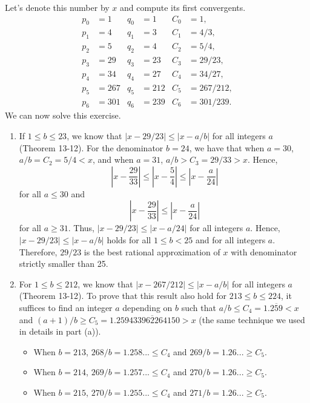 \begin{solution}
    Let's denote this number by $x$ and compute its first convergents.
    \begin{align*}
        p_0 &= 1 & q_0 &= 1 & C_0 &= 1, \\
        p_1 &= 4 & q_1 &= 3 & C_1 &= 4/3, \\
        p_2 &= 5 & q_2 &= 4 & C_2 &= 5/4, \\
        p_3 &= 29 & q_3 &= 23 & C_3 &= 29/23, \\
        p_4 &= 34 & q_4 &= 27 & C_4 &= 34/27, \\
        p_5 &= 267 & q_5 &= 212 & C_5 &= 267/212, \\
        p_6 &= 301 & q_6 &= 239 & C_6 &= 301/239.
    \end{align*} 
    We can now solve this exercise.
    \begin{enumerate}
        \item If $1 \leq b \leq 23$, we know that $|x - 29/23| \leq |x - a/b|$ for all integers $a$ (Theorem 13-12). For the denominator $b = 24$, we have that when $a = 30$, $a/b = C_2 = 5/4 < x$, and when $a = 31$, $a/b > C_3 = 29/33 > x$. Hence, 
        $$\left|x - \frac{29}{33}\right| \leq \left|x - \frac{5}{4}\right| \leq \left|x - \frac{a}{24}\right|$$
        for all $a \leq 30$ and 
        $$\left|x - \frac{29}{33}\right| \leq \left|x - \frac{a}{24}\right|$$
        for all $a \geq 31$. Thus, $|x - 29/23| \leq |x - a/24|$ for all integers $a$. Hence, $|x - 29/23| \leq |x - a/b|$ holds for all $1 \leq b < 25$ and for all integers $a$. Therefore, $29/23$ is the best rational approximation of $x$ with denominator strictly smaller than 25. 
        \item For $1 \leq b \leq 212$, we know that $|x - 267/212| \leq |x - a/b|$ for all integers $a$ (Theorem 13-12). To prove that this result also hold for $213 \leq b \leq 224$, it suffices to find an integer $a$ depending on $b$ such that $a/b \leq C_4 = 1.\overline{259} < x$ and $(a+1)/b \geq C_5 = 1.25\overline{9433962264150} > x$ (the same technique we used in details in part (a)).
        \begin{itemize}
            \item When $b = 213$, $268/b = 1.258... \leq C_4$ and $269/b = 1.26... \geq C_5$.
            \item When $b = 214$, $269/b = 1.257... \leq C_4$ and $270/b = 1.26... \geq C_5$.
            \item When $b = 215$, $270/b = 1.255... \leq C_4$ and $271/b = 1.26... \geq C_5$.

\end{itemize}
\end{enumerate}
\end{solution}

